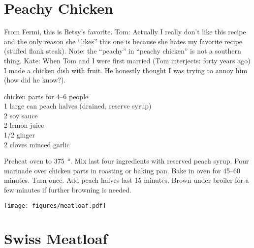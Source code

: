 \section{Peachy Chicken
}

\begin{open}
  From Fermi, this is Betsy's favorite.  Tom: Actually I really don't
  like this recipe and the only reason she ``likes'' this one is because she
  hates my favorite recipe (stuffed flank steak).  Note: the ``peachy'' in
  ``peachy chicken'' is not a southern thing.  Kate: When Tom and I were first
  married (Tom interjects: forty years ago) I made a chicken dish with fruit.
  He honestly thought I was trying to annoy him (how did he know?).
\end{open}
\begin{ingredients}
  chicken parts for \numrange{4}{6} people\\
  1 large can peach halves (drained, reserve syrup)\\
  \SI{2}{\tblspoon} soy sauce\\
  \SI{2}{\tblspoon} lemon juice\\
  \SI{1/2}{\tblspoon} ginger\\
  2 cloves minced garlic
\end{ingredients}
Preheat oven to \SI{375}{\degree}.  Mix last four ingredients with reserved peach
syrup.  Pour marinade over chicken parts in roasting or baking pan. Bake in
oven for \numrange{45}{60} minutes. Turn once.  Add peach halves last
15 minutes.  Brown under broiler for a few minutes if further browning
is needed.
\begin{center}
    \texttt{[image: figures/meatloaf.pdf]}
\end{center}

\section{Swiss Meatloaf}
\label{sec:swiss-meatloaf}

